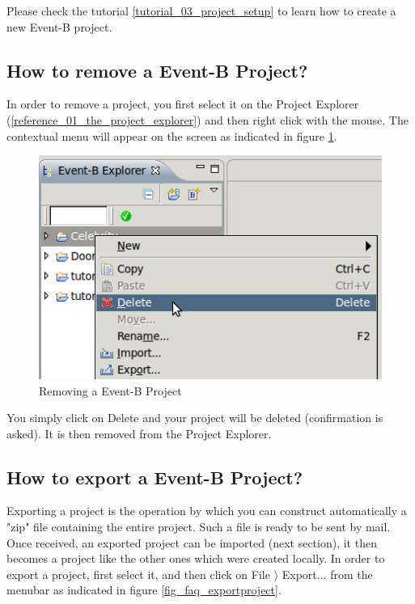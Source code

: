 
Please check the tutorial \ref{tutorial_03_project_setup} to learn how to create a new Event-B project.

\subsection{How to remove a Event-B Project?}


In order to remove a project, you first select it on the \textsf{Project Explorer} (\ref{reference_01_the_project_explorer}) and then right click with the mouse. The contextual menu will appear on the screen as indicated in figure \ref{fig_faq_removeproject}.

\begin{figure}[!h]
\begin{center}
	\includegraphics{img/faq/faq_removeproject.png}
	\caption{Removing a Event-B Project}
	\label{fig_faq_removeproject}
\end{center}
\end{figure}

You simply click on Delete and your project will be deleted (confirmation is asked). It is then removed from the \textsf{Project Explorer}.

\subsection{How to export a Event-B Project?}


Exporting a project is the operation by which you can construct automatically a "zip" file containing the entire project. Such a file is ready to be sent by mail. Once received, an exported project can be imported (next section), it then becomes a project like the other ones which were created locally. In order to export a project, first select it, and then click on \textsf{File $\rangle$ Export...} from the menubar as indicated in figure \ref{fig_faq_exportproject}. 

